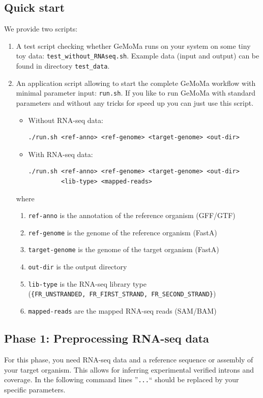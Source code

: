 \documentclass{article}
\begin{document}
\subsection{Quick start}
We provide two scripts:
\begin{enumerate}
	\item A test script checking whether GeMoMa runs on your system on some tiny toy data: \texttt{test\_without\_RNAseq.sh}. Example data (input and output) can be found in directory \texttt{test\_data}.
	\item An application script allowing to start the complete GeMoMa workflow with minimal parameter input: \texttt{run.sh}. If you like to run GeMoMa with standard parameters and without any tricks for speed up you can just use this script.
\begin{itemize}
	\item Without RNA-seq data:
\begin{verbatim}
./run.sh <ref-anno> <ref-genome> <target-genome> <out-dir>
\end{verbatim}	
	\item With RNA-seq data:
\begin{verbatim}
./run.sh <ref-anno> <ref-genome> <target-genome> <out-dir>
         <lib-type> <mapped-reads>
\end{verbatim}
\end{itemize}
where
\begin{enumerate}
	\item \texttt{ref-anno} is the annotation of the reference organism (GFF/GTF)
	\item \texttt{ref-genome} is the genome of the reference organism (FastA)
	\item \texttt{target-genome} is the genome of the target organism (FastA)
	\item \texttt{out-dir} is the output directory
	\item \texttt{lib-type} is the RNA-seq library type\\
		(\verb"{FR_UNSTRANDED, FR_FIRST_STRAND, FR_SECOND_STRAND}")
	\item \texttt{mapped-reads} are the mapped RNA-seq reads (SAM/BAM)
\end{enumerate}
\end{enumerate}

\clearpage

\subsection{Phase 1: Preprocessing RNA-seq data}
For this phase, you need RNA-seq data and a reference sequence or assembly of your target organism.
This allows for inferring experimental verified introns and coverage. In the following command lines ''\verb"..."`` should be replaced by your specific parameters.
\end{document}
